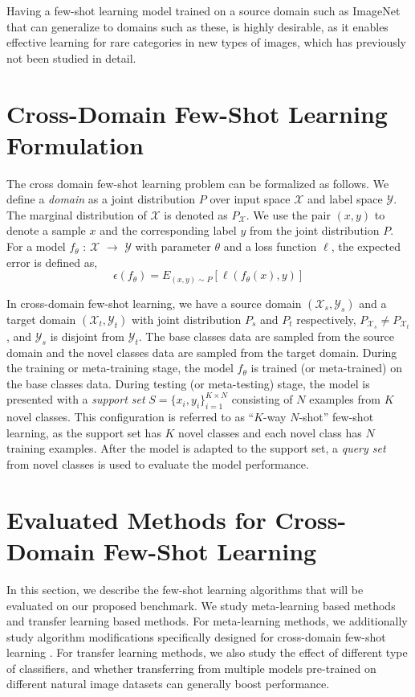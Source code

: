 \documentclass[runningheads]{llncs}
\begin{document}
Having a few-shot learning model trained on a source domain such as ImageNet \cite{deng2009imagenet} that can generalize to domains such as these, is highly desirable, as it enables effective learning for rare categories in new types of images, which has previously not been studied in detail. 

\section{Cross-Domain Few-Shot Learning Formulation}

The cross domain few-shot learning problem can be formalized as follows. We define a \textit{domain} as a joint distribution $P$ over input space $\mathcal{X}$ and label space $\mathcal{Y}$. The marginal distribution of $\mathcal{X}$ is denoted as $P_\mathcal{X}$. We use the pair $(x, y)$ to denote a sample $x$ and the corresponding label $y$ from the joint distribution $P$. For a model $f_\theta$ : $\mathcal{X}$ $\rightarrow$ $\mathcal{Y}$ with parameter $\theta$ and a loss function $\ell$, the expected error is defined as,
\begin{equation}
    \epsilon(f_\theta) = E_{(x, y) \sim P} [\ell(f_\theta(x), y)]
\end{equation}

In cross-domain few-shot learning, we have a source domain $(\mathcal{X}_s, \mathcal{Y}_s)$ and a target domain $(\mathcal{X}_t, \mathcal{Y}_t)$ with joint distribution $P_s$ and $P_t$ respectively,  $P_{\mathcal{X}_s} \neq P_{\mathcal{X}_t}$, and $\mathcal{Y}_s$  is disjoint from $\mathcal{Y}_t$. The base classes data are sampled from the source domain and the novel classes data are sampled from the target domain. During the training or meta-training stage, the model $f_\theta$ is trained (or meta-trained) on the base classes data. During testing (or meta-testing) stage, the model is presented with a \textit{support set} $S = \{x_i, y_i\}_{i=1}^{K \times N}$ consisting of $N$ examples from $K$ novel classes. This configuration is referred to as ``$K$-way $N$-shot'' few-shot learning, as the support set has $K$ novel classes and each novel class has $N$ training examples. After the model is adapted to the support set, a \textit{query set} from novel classes is used to evaluate the model performance.


\section{Evaluated Methods for Cross-Domain Few-Shot Learning}
\label{sec:methods}
In this section, we describe the few-shot learning algorithms that will be evaluated on our proposed benchmark. We study meta-learning based methods and transfer learning based methods. For meta-learning methods, we additionally study algorithm modifications specifically designed for cross-domain few-shot learning \cite{tsengcrossdomain}. For transfer learning methods, we also study the effect of different type of classifiers, and whether transferring from multiple models pre-trained on different natural image datasets can generally boost performance. 
\end{document}
